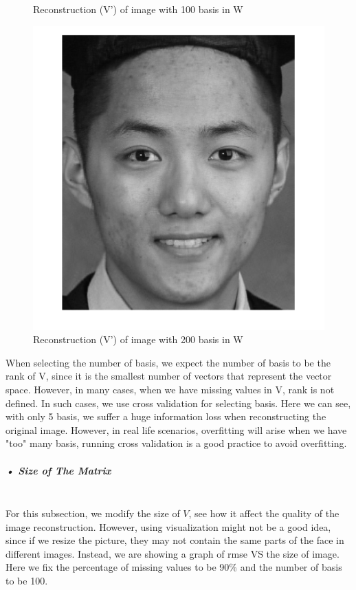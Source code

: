 \documentclass[11pt]{article} %
\begin{document}
\begin{figure}[H]
  \caption{Reconstruction (V') of image with 100 basis in W}\label{fig:awesome_image2}
\endminipage\hfill
{}%
  \includegraphics[width=\linewidth]{mySelfie50M200R.png}
  \caption{Reconstruction (V') of image with 200 basis in W}\label{fig:awesome_image3}
\endminipage
\end{figure}
When selecting the number of basis, we expect the number of basis to be the rank of V, since it is the smallest number of vectors that represent the vector space. However, in many cases, when we have missing values in V, rank is not defined. In such cases, we use cross validation for selecting basis. Here we can see, with only 5 basis, we suffer a huge information loss when reconstructing the original image. However, in real life scenarios, overfitting will arise when we have "too" many basis, running cross validation is a good practice to avoid overfitting.
\subparagraph{• Size of The Matrix}\mbox{}\\
For this subsection, we modify the size of $V$, see how it affect the quality of the image reconstruction. However, using visualization might not be a good idea, since if we resize the picture, they may not contain the same parts of the face in different images. Instead, we are showing a graph of rmse VS the size of image. Here we fix the percentage of missing values to be 90\% and the number of basis to be 100.
\end{document}
